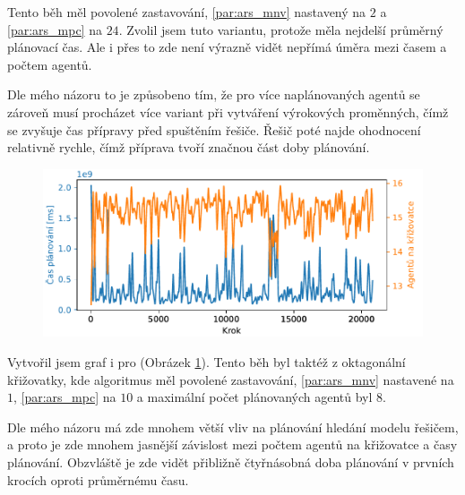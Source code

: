 Tento běh měl povolené zastavování, \ref{par:ars_mnv} nastavený na $2$ a \ref{par:ars_mpc} na $24$.
Zvolil jsem tuto variantu, protože měla nejdelší průměrný plánovací čas.
Ale i přes to zde není výrazně vidět nepřímá úměra mezi časem a počtem agentů.

Dle mého názoru to je způsobeno tím, že pro více naplánovaných agentů se zároveň musí procházet více variant
při vytváření výrokových proměnných, čímž se zvyšuje čas přípravy před spuštěním řešiče.
Řešič poté najde ohodnocení relativně rychle, čímž příprava tvoří značnou část doby plánování.

\begin{figure}[h]
	\centering
	\includegraphics[width=140mm]{../img/CasVsAgentiSATRA}
	\caption{}
	\label{fig:cas_vs_agenti_satra}
\end{figure}

Vytvořil jsem graf i pro  (Obrázek \ref{fig:cas_vs_agenti_satra}).
Tento běh byl taktéž z oktagonální křižovatky, kde algoritmus měl povolené zastavování,
\ref{par:ars_mnv} nastavené na $1$, \ref{par:ars_mpc} na $10$ a maximální počet plánovaných agentů byl $8$.

Dle mého názoru má zde mnohem větší vliv na plánování hledání modelu řešičem,
a proto je zde mnohem jasnější závislost mezi počtem agentů na křižovatce a časy plánování.
Obzvláště je zde vidět přibližně čtyřnásobná doba plánování v prvních krocích oproti průměrnému času.
